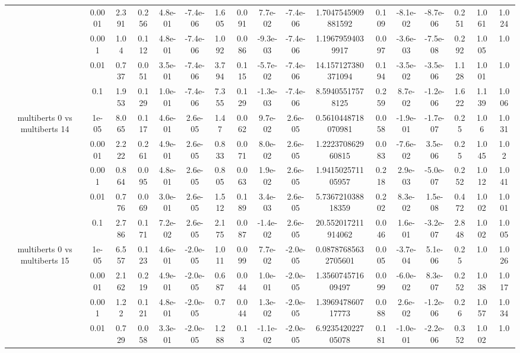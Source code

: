 \begin{tabular}{|c|c|c|c|c|c|c|c|c|c|c|c|c|c|c|c|c|}
 & 0.0001 & 2.391 & 0.256 & 4.8e-01 & -7.4e-06 & 1.605 & 0.091 & 7.7e-02 & -7.4e-06 & 1.7047545909881592 & 0.109 & -8.1e-02 & -8.7e-06 & 0.251 & 1.061 & 1.024 \\
 & 0.001 & 1.04 & 0.112 & 4.8e-01 & -7.4e-06 & 1.092 & 0.086 & -9.3e-03 & -7.4e-06 & 1.19679594039917 & 0.097 & -3.6e-03 & -7.5e-08 & 0.292 & 1.005 & 1.0 \\
 & 0.01 & 0.737 & 0.051 & 3.5e-01 & -7.4e-06 & 3.794 & 0.115 & -5.7e-02 & -7.4e-06 & 14.157127380371094 & 0.194 & -3.5e-02 & -3.5e-06 & 1.128 & 1.001 & 1.0 \\
 & 0.1 & 1.953 & 0.129 & 1.0e-01 & -7.4e-06 & 7.355 & 0.129 & -1.3e-03 & -7.4e-06 & 8.59405517578125 & 0.259 & 8.7e-02 & -1.2e-06 & 1.622 & 1.139 & 1.006 \\
\hline
\multirow{5}{*}{multiberts 0 vs multiberts 14} & 1e-05 & 8.065 & 0.117 & 4.6e-01 & 2.6e-05 & 1.47 & 0.062 & 9.7e-02 & 2.6e-05 & 0.5610448718070981 & 0.058 & -1.9e-01 & -1.7e-07 & 0.25 & 1.06 & 1.031 \\
 & 0.0001 & 2.222 & 0.261 & 4.9e-01 & 2.6e-05 & 0.833 & 0.071 & 8.0e-02 & 2.6e-05 & 1.222370862960815 & 0.083 & -7.6e-02 & 3.5e-06 & 0.25 & 1.045 & 1.02 \\
 & 0.001 & 0.864 & 0.095 & 4.8e-01 & 2.6e-05 & 0.805 & 0.063 & 1.9e-02 & 2.6e-05 & 1.941502571105957 & 0.218 & 2.9e-03 & -5.0e-07 & 0.252 & 1.012 & 1.041 \\
 & 0.01 & 0.776 & 0.069 & 3.0e-01 & 2.6e-05 & 1.512 & 0.189 & 3.4e-03 & 2.6e-05 & 5.736721038818359 & 0.202 & 8.3e-02 & 1.5e-08 & 0.472 & 1.002 & 1.001 \\
 & 0.1 & 2.786 & 0.171 & 7.2e-02 & 2.6e-05 & 2.175 & 0.087 & -1.4e-02 & 2.6e-05 & 20.552017211914062 & 0.046 & 1.6e-01 & -3.2e-07 & 2.848 & 1.002 & 1.005 \\
\hline
\multirow{5}{*}{multiberts 0 vs multiberts 15} & 1e-05 & 6.557 & 0.123 & 4.6e-01 & -2.0e-05 & 1.011 & 0.099 & 7.7e-02 & -2.0e-05 & 0.08787685632705601 & 0.005 & -3.7e-04 & 5.1e-06 & 0.25 & 1.0 & 1.026 \\
 & 0.0001 & 2.162 & 0.219 & 4.9e-01 & -2.0e-05 & 0.687 & 0.044 & 1.0e-01 & -2.0e-05 & 1.356074571609497 & 0.099 & -6.0e-02 & 8.3e-07 & 0.252 & 1.038 & 1.017 \\
 & 0.001 & 1.22 & 0.121 & 4.8e-01 & -2.0e-05 & 0.7 & 0.044 & 1.3e-02 & -2.0e-05 & 1.396947860717773 & 0.088 & 2.6e-02 & -1.2e-06 & 0.26 & 1.057 & 1.034 \\
 & 0.01 & 0.729 & 0.058 & 3.3e-01 & -2.0e-05 & 1.288 & 0.13 & -1.1e-02 & -2.0e-05 & 6.923542022705078 & 0.181 & -1.0e-01 & -2.2e-06 & 0.352 & 1.002 & 1.0 \\

\end{tabular}
